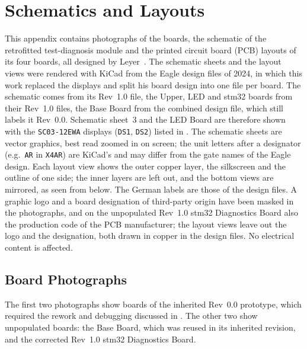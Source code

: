 \chapter{Schematics and Layouts}
\label{app:schematics}
\raggedbottom

This appendix contains photographs of the boards, the schematic of the retrofitted test-diagnosis module and the printed circuit board (PCB) layouts of its four boards, all designed by Leyer~\cite{leyer2023}. The schematic sheets and the layout views were rendered with KiCad from the Eagle design files of 2024, in which this work replaced the displays and split his board design into one file per board. The schematic comes from its Rev~1.0 file, the Upper, LED and \gls{stm32} boards from their Rev~1.0 files, the Base Board from the combined design file, which still labels it Rev~0.0. Schematic sheet~3 and the LED Board are therefore shown with the \texttt{SC03-12EWA} displays (\texttt{DS1}, \texttt{DS2}) listed in . The schematic sheets are vector graphics, best read zoomed in on screen; the unit letters after a designator (e.g.\ \texttt{AR} in \texttt{X4AR}) are KiCad's and may differ from the gate names of the Eagle design. Each layout view shows the outer copper layer, the silkscreen and the outline of one side; the inner layers are left out, and the bottom views are mirrored, as seen from below. The German labels are those of the design files. A graphic logo and a board designation of third-party origin have been masked in the photographs, and on the unpopulated Rev~1.0 \gls{stm32} Diagnostics Board also the production code of the PCB manufacturer; the layout views leave out the logo and the designation, both drawn in copper in the design files. No electrical content is affected.


\section{Board Photographs}
\label{app:rev0_photos}

The first two photographs show boards of the inherited Rev~0.0 prototype, which required the rework and debugging discussed in . The other two show unpopulated boards: the Base Board, which was reused in its inherited revision, and the corrected Rev~1.0 \gls{stm32} Diagnostics Board.

